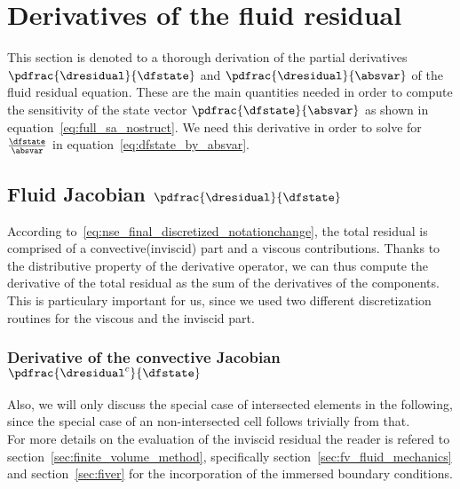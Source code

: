 \documentclass[../main.tex]{subfiles}
\begin{document}
\setlength{\delimitershortfall}{0pt}

\section{Derivatives of the fluid residual}\label{sec:dresidual_derivative}
This section is denoted to a thorough derivation of the partial derivatives $\pdfrac{\dresidual}{\dfstate}$ and $\pdfrac{\dresidual}{\absvar}$ of the fluid residual equation.
These are the main quantities needed in order to compute the sensitivity of the state vector $\pdfrac{\dfstate}{\absvar}$ as shown in equation~\ref{eq:full_sa_nostruct}.
We need this derivative in order to solve for $\frac{\dfstate}{\absvar}$ in equation~\eqref{eq:dfstate_by_absvar}.\\


\subsection{Fluid Jacobian $\pdfrac{\dresidual}{\dfstate}$}\label{sec:fluid_jacobian}





According to~\eqref{eq:nse_final_discretized_notationchange}, the total residual is comprised of a convective(inviscid) part and a viscous contributions. Thanks to the distributive property of the derivative operator, we can thus compute the derivative of the total residual as the sum of the derivatives of the components. This is particulary important for us, since we used two different discretization routines for the viscous and the inviscid part.\\



\subsubsection{Derivative of the convective Jacobian $\pdfrac{\dresidual^c}{\dfstate}$}

Also, we will only discuss the special case of intersected elements in the following, since the special case of an non-intersected cell follows trivially from that.\\
For more details on the evaluation of the inviscid residual the reader is refered to section~\ref{sec:finite_volume_method}, specifically section~\ref{sec:fv_fluid_mechanics} and section~\ref{sec:fiver} for the incorporation of the immersed boundary conditions.
\end{document}
